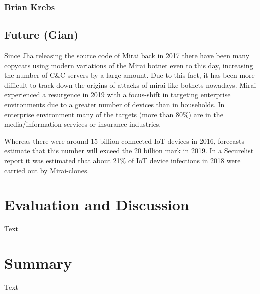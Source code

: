 	\subsubsection{Brian Krebs}
	
	\subsection{Future (Gian)}
Since Jha releasing the source code of Mirai back in 2017 there have been many copycats using modern variations of the Mirai botnet even to this day, increasing the number of C\&C servers by a large amount. Due to this fact, it has been more difficult to track down the origins of attacks of mirai-like botnets nowadays.
Mirai experienced a resurgence in 2019 with a focus-shift in targeting enterprise environments due to a greater number of devices than in households. In enterprise environment many of the targets (more than 80\%) are in the media/information services or insurance industries.

Whereas there were around 15 billion connected IoT devices in 2016, forecasts estimate that this number will exceed the 20 billion mark in 2019. In a Securelist report it was estimated that about 21\% of IoT device infections in 2018 were carried out by Mirai-clones.

\section{Evaluation and Discussion}
Text

\section{Summary}
Text

